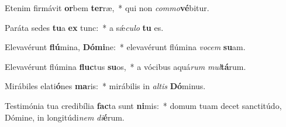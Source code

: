 \item Etenim firmávit \textbf{or}bem \textbf{ter}ræ,~* qui non \textit{com}\textit{mo}\textbf{vé}bitur.
\item Paráta sedes \textbf{tu}a \textbf{ex} tunc:~* a sǽ\textit{cu}\textit{lo} \textbf{tu} es.
\item Elevavérunt \textbf{flú}mina, \textbf{Dó}\textbf{mi}ne:~* elevavérunt flúmina \textit{vo}\textit{cem} \textbf{su}am.
\item Elevavérunt flúmina \textbf{fluc}tus \textbf{su}os,~* a vócibus aquá\textit{rum} \textit{mul}\textbf{tá}rum.
\item Mirábiles elati\textbf{ó}nes \textbf{ma}ris:~* mirábilis in \textit{al}\textit{tis} \textbf{Dó}minus.
\item Testimónia tua credibília \textbf{fac}ta sunt \textbf{ni}mis:~* domum tuam decet sanctitúdo, Dómine, in longitúdi\textit{nem} \textit{di}\textbf{é}rum.
